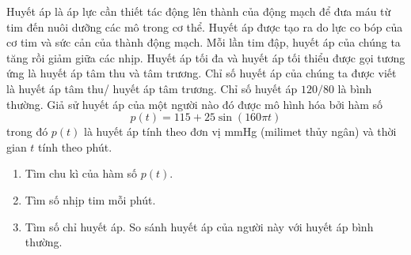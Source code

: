 \begin{bt}%
	Huyết áp là áp lực cần thiết tác động lên thành của động mạch để đưa máu từ tim đến nuôi dưỡng các mô trong cơ thể. Huyết áp được tạo ra do lực co bóp của cơ tim và sức cản của thành động mạch. Mỗi lần tim đập, huyết áp của chúng ta tăng rồi giảm giữa các nhịp. Huyết áp tối đa và huyết áp tối thiểu được gọi tương ứng là huyết áp tâm thu và tâm trương. Chỉ số huyết áp của chúng ta được viết là huyết áp tâm thu/ huyết áp tâm trương. Chỉ số huyết áp $120/80$ là bình thường. Giả sử huyết áp của một người nào đó được mô hình hóa bởi hàm số
	$$p(t)=115+25\sin(160\pi t)$$
	trong đó $p(t)$ là huyết áp tính theo đơn vị mmHg (milimet thủy ngân) và thời gian $t$ tính theo phút.
	\begin{enumerate}
		\item Tìm chu kì của hàm số $p(t)$.
		\item Tìm số nhịp tim mỗi phút.
		\item Tìm số chỉ huyết áp. So sánh huyết áp của người này với huyết áp bình thường.
	\end{enumerate}
\end{bt}

